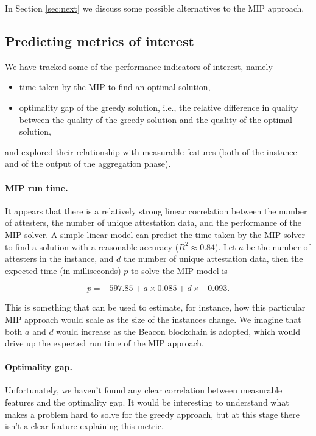 \documentclass{article}
\begin{document}
\noindent
In Section \ref{sec:next} we discuss some possible alternatives to the MIP
approach.

\subsection{Predicting metrics of interest}

We have tracked some of the performance indicators of interest, namely
%
\begin{itemize}
  \item time taken by the MIP to find an optimal solution,
  \item optimality gap of the greedy solution, i.e., the relative
  difference in quality between the quality of the greedy solution
  and the quality of the optimal solution,
\end{itemize}
%
and explored their relationship with measurable features (both of the instance
and of the output of the aggregation phase). 

\paragraph{MIP run time.} It appears that there is a relatively strong linear
correlation between the number of attesters, the number of unique attestation
data, and the performance of the MIP solver. A simple linear model can predict
the time taken by the MIP solver to find a solution with a reasonable accuracy
($R^{2} \approx 0.84$). Let $a$ be the number of attesters in the instance, and
$d$ the number of unique attestation data, then the expected time (in
milliseconds) $p$ to solve the MIP model is

\begin{equation}
  p = -597.85 + a \times 0.085 + d \times -0.093.
\end{equation}

\noindent
This is something that can be used to estimate, for instance, how this
particular MIP approach would scale as the size of the instances change. We
imagine that both $a$ and $d$ would increase as the Beacon blockchain is
adopted, which would drive up the expected run time of the MIP approach.

\paragraph{Optimality gap.} Unfortunately, we haven't found any clear
correlation between measurable features and the optimality gap. It would be
interesting to understand what makes a problem hard to solve for the greedy
approach, but at this stage there isn't a clear feature explaining this metric.
\end{document}
